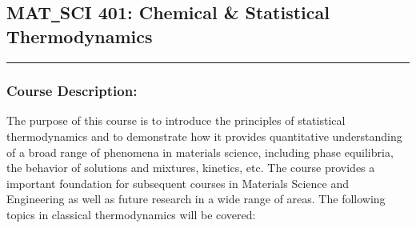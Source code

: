 	\subsection{MAT\texttt{\_}SCI 401: Chemical \& Statistical Thermodynamics}
	\vspace{-0.5em} \hfill \rule{0.4\textwidth}{.4pt}\newline
	\null \hfill {} \newline
	\null \hfill {}
\normalfont
		\subsubsection*{Course Description:}
	The purpose of this course is to introduce the principles of statistical thermodynamics and to demonstrate how it provides quantitative understanding of a broad range of phenomena in materials science, including phase equilibria, the behavior of solutions and mixtures, kinetics, etc. The course provides a important foundation for subsequent courses in Materials Science and Engineering as well as future research in a wide range of areas. The following topics in classical thermodynamics will be covered:
